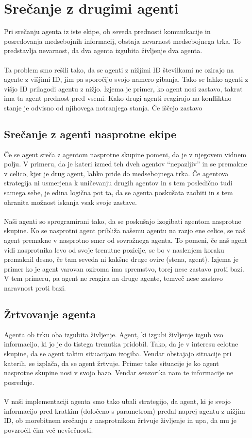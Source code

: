 \documentclass[12pt,a4paper,openany]{book}
\begin{document}
\section{Srečanje z drugimi agenti}

Pri srečanju agenta iz iste ekipe, ob seveda prednosti komunikacije in posredovanja  medsebojnih informacij, 
obstaja nevarnost medsebojnega trka. To predstavlja nevarnost, da dva agenta izgubita življenje dva agenta.\\
\\
Ta problem smo rešili tako, da se agenti z nižjimi ID številkami ne ozirajo na agente z višjimi ID, jim pa 
sporočijo svojo namero gibanja. Tako se lahko agenti z višjo ID prilagodi agentu z nižjo. Izjema je primer, 
ko agent nosi zastavo, takrat ima ta agent prednost pred vsemi. Kako drugi agenti reagirajo na konfliktno 
stanje je odvisno od njihovega notranjega stanja. Če iščejo zastavo 

\subsection{Srečanje z agenti nasprotne ekipe}
Če se agent sreča z agentom nasprotne skupine pomeni, da je v njegovem vidnem polju. V primeru, da je kateri
izmed teh dveh agentov “nepazljiv” in se premakne v celico, kjer je drug agent, lahko pride do medsebojnega 
trka. Če agentova strategija ni usmerjena k uničevanju drugih agentov in s tem posledično tudi samega sebe, 
je edina logična pot ta, da se agenta poskušata zaobiti in s tem ohranita možnost iskanja vsak svoje zastave.\\
\\
Naši agenti so sprogramirani tako, da se poskušajo izogibati agentom nasprotne skupine. Ko se nasprotni
agent približa našemu agentu na razjo ene celice, se naš agent premakne v nasprotno smer od sovražnega agenta.
To pomeni, če naš agent vidi nasprotnika levo od svoje trenutne pozicije, se bo v naslenjem koraku premaknil desno,
če tam seveda ni kakšne druge ovire (stena, agent). Izjema je primer ko je agent varovan oziroma ima spremstvo,
torej nese zastavo proti bazi. V tem primeru, pa agent ne reagira na druge agente, temveč nese zastavo naravnost
proti bazi.


\subsection{Žrtvovanje agenta} 
Agenta ob trku oba izgubita življenje. Agent, ki izgubi življenje izgub vso informacijo, ki jo je do
tistega trenutka pridobil. Tako, da je v interesu celotne skupine, da se agent takim situacijam izogiba.
Vendar obstajajo situacije pri katerih, se izplača, da se agent žrtvuje. Primer take situacije je ko agent
nasprotne skupine nosi v svojo bazo. Vendar senzorika nam te informacije ne posreduje.\\
\\
V naši implementaciji agenta smo tako ubali strategijo, da agent, ki je svojo informacijo pred kratkim
(določeno s parametrom) predal naprej agentu z nižjim ID, ob morebitnem srečanju z nasprotnikom žrtvuje
življenje in upa, da mu je povzročil čim več nevšečnosti.
\newpage
\end{document}
